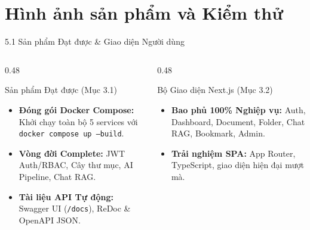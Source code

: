 \documentclass[10pt, aspectratio=169]{beamer}
\begin{document}
\section{Hình ảnh sản phẩm và Kiểm thử}

\begin{frame}{5.1 Sản phẩm Đạt được \& Giao diện Người dùng}
    \begin{columns}[T]
        \begin{column}{0.48\textwidth}
            \begin{block}{Sản phẩm Đạt được (Mục 3.1)}
                \begin{itemize}
                    \item \textbf{Đóng gói Docker Compose:} Khởi chạy toàn bộ 5 services với \texttt{docker compose up --build}.
                    \item \textbf{Vòng đời Complete:} JWT Auth/RBAC, Cây thư mục, AI Pipeline, Chat RAG.
                    \item \textbf{Tài liệu API Tự động:} Swagger UI (\texttt{/docs}), ReDoc \& OpenAPI JSON.
                \end{itemize}
            \end{block}
        \end{column}

        \begin{column}{0.48\textwidth}
            \begin{alertblock}{Bộ Giao diện Next.js (Mục 3.2)}
                \begin{itemize}
                    \item \textbf{Bao phủ 100\% Nghiệp vụ:} Auth, Dashboard, Document, Folder, Chat RAG, Bookmark, Admin.
                    \item \textbf{Trải nghiệm SPA:} App Router, TypeScript, giao diện hiện đại mượt mà.
                \end{itemize}
            \end{alertblock}
        \end{column}
    \end{columns}
\end{frame}
\end{document}
